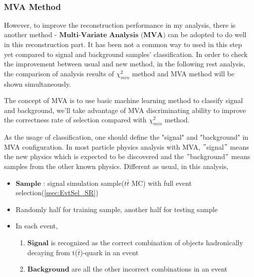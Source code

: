 \begin{figure}[H]
\centering
    \\
\caption{}
\label{EventSelReco:fig:chi2_SR_NC_Mjjb}
\end{figure}
\FloatBarrier

		\subsubsection{MVA Method}
		\label{sssec:mva_intro} 

			However, to improve the reconstruction performance in my analysis, there is another method - $\textbf{Multi-Variate Analysis (MVA)}$ can be adopted to do well in this reconstruction part. It has been not a common way to used in this step yet compared to signal and background samples' classification. In order to check the improvement between usual and new method, in the following rest analysis, the comparison of analysis results of $\chi^2_{min}$ method and MVA method will be shown simultaneously. 

			The concept of MVA is to use basic machine learning method to classify signal and background, we'll take advantage of MVA discriminating ability to improve the correctness rate of selection compared with $\chi^2_{min}$ method.
				
			As the usage of classification, one should define the "signal" and "background" in MVA configuration. In most particle physics analysis with MVA, $"$signal$"$ means the new physics which is expected to be discovered and the $"$background$"$ means samples from the other known physics. Different as usual, in this analysis,

			\begin{itemize}

				\item $\textbf{Sample}$ : signal simulation sample($t\bar{t}$ MC) with full event selection(\ref{ssec:EvtSel_SR})
				\item Randomly half for training sample, another half for testing sample
				\item In each event,
				\begin{enumerate}
					\item $\textbf{Signal}$ is recognized as the correct combination of objects hadronically decaying from t($\bar{t}$)-quark in an event
					\item $\textbf{Background}$ are all the other incorrect combinations in an event
				\end{enumerate}
			\end{itemize}

